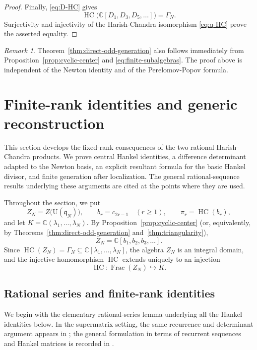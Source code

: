 \documentclass[11pt]{amsart}
\numberwithin{equation}{section}
\theoremstyle{definition}
\theoremstyle{remark}
\newtheorem{remark}[theorem]{Remark}
\newcommand{\C}{\mathbb C}
\newcommand{\q}{\mathfrak q}
\newcommand{\U}{\mathrm U}
\newcommand{\HC}{\operatorname{HC}}
\begin{document}
\begin{proof}
Finally, \eqref{eq:D-HC} gives
\[
 \HC\bigl(\C[D_1,D_3,D_5,\ldots]\bigr)=\Gamma_N.
\]
Surjectivity and injectivity of the Harish-Chandra isomorphism
\eqref{eq:q-HC} prove the asserted equality. 
\end{proof}


\begin{remark}
Theorem~\ref{thm:direct-odd-generation} also follows immediately from
Proposition~\ref{prop:cyclic-center} and
\eqref{eq:finite-subalgebras}.  The proof above is independent of the
Newton identity and of the Perelomov-Popov formula.
\end{remark}


\section{Finite-rank identities and generic reconstruction}
\label{sec:hankel-reconstruction}

This section develops the fixed-rank consequences of the two rational
Harish-Chandra products.  We prove central Hankel identities, a
difference determinant adapted to the Newton basis, an explicit
resultant formula for the basic Hankel divisor, and finite generation
after localization.  The general rational-sequence results underlying
these arguments are cited at the points where they are used.

Throughout the section, we put
\[
 Z_N=Z\bigl(\U(\q_N)\bigr),
 \qquad
 b_r=c_{2r-1}\quad(r\geq1),
 \qquad
 \pi_r=\HC(b_r),
\]
and let \(K=\C(\lambda_1,\ldots,\lambda_N)\).  By
Proposition~\ref{prop:cyclic-center} (or, equivalently, by
Theorems~\ref{thm:direct-odd-generation} and~\ref{thm:triangularity}),
\begin{equation}
 Z_N=\C[b_1,b_2,b_3,\ldots].
 \label{eq:center-generated-by-b}
\end{equation}
Since \(\HC(Z_N)=\Gamma_N\subseteq
\C[\lambda_1,\ldots,\lambda_N]\), the algebra \(Z_N\) is an integral
domain, and the injective homomorphism \(\HC\) extends uniquely to an
injection
\[
 \HC:\operatorname{Frac}(Z_N)\hookrightarrow K.
\]

\subsection{Rational series and finite-rank identities}

We begin with the elementary rational-series lemma underlying all the
Hankel identities below.  In the supermatrix setting, the same
recurrence and determinant argument appears in
\cite[Eq.~(3.1) and Corollary~(3.8)]{KV2005}; the general formulation in
terms of recurrent sequences and Hankel matrices is recorded in
\cite[Appendix~A]{KV2005}.
\end{document}
